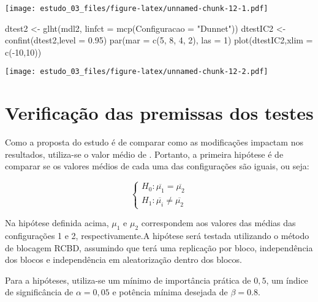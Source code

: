 \documentclass[
]{article}
\newenvironment{Shaded}{\begin{snugshade}}{\end{snugshade}}
\newcommand{\AttributeTok}[1]{\textcolor[rgb]{0.77,0.63,0.00}{#1}}
\newcommand{\DecValTok}[1]{\textcolor[rgb]{0.00,0.00,0.81}{#1}}
\newcommand{\FloatTok}[1]{\textcolor[rgb]{0.00,0.00,0.81}{#1}}
\newcommand{\FunctionTok}[1]{\textcolor[rgb]{0.00,0.00,0.00}{#1}}
\newcommand{\NormalTok}[1]{#1}
\newcommand{\OtherTok}[1]{\textcolor[rgb]{0.56,0.35,0.01}{#1}}
\newcommand{\SpecialCharTok}[1]{\textcolor[rgb]{0.00,0.00,0.00}{#1}}
\newcommand{\StringTok}[1]{\textcolor[rgb]{0.31,0.60,0.02}{#1}}
\begin{document}
\texttt{[image: estudo\_03\_files/figure-latex/unnamed-chunk-12-1.pdf]}

\begin{Shaded}
\begin{Highlighting}[]
\NormalTok{dtest2 }\OtherTok{\textless{}{-}} \FunctionTok{glht}\NormalTok{(mdl2, }\AttributeTok{linfct =} \FunctionTok{mcp}\NormalTok{(}\AttributeTok{Configuracao =} \StringTok{"Dunnet"}\NormalTok{))}
\NormalTok{dtestIC2 }\OtherTok{\textless{}{-}} \FunctionTok{confint}\NormalTok{(dtest2,}\AttributeTok{level =} \FloatTok{0.95}\NormalTok{)}
\FunctionTok{par}\NormalTok{(}\AttributeTok{mar =} \FunctionTok{c}\NormalTok{(}\DecValTok{5}\NormalTok{, }\DecValTok{8}\NormalTok{, }\DecValTok{4}\NormalTok{, }\DecValTok{2}\NormalTok{), }\AttributeTok{las =} \DecValTok{1}\NormalTok{)}
\FunctionTok{plot}\NormalTok{(dtestIC2,}\AttributeTok{xlim =} \FunctionTok{c}\NormalTok{(}\SpecialCharTok{{-}}\DecValTok{10}\NormalTok{,}\DecValTok{10}\NormalTok{))}
\end{Highlighting}
\end{Shaded}

\texttt{[image: estudo\_03\_files/figure-latex/unnamed-chunk-12-2.pdf]}

\hypertarget{verificauxe7uxe3o-das-premissas-dos-testes}{%
\section{Verificação das premissas dos
testes}\label{verificauxe7uxe3o-das-premissas-dos-testes}}

Como a proposta do estudo é de comparar como as modificações impactam
nos resultados, utiliza-se o valor médio de . Portanto, a primeira
hipótese é de comparar se os valores médios de cada uma das
configurações são iguais, ou seja:

\[
\begin{cases} H_0: \overline{\mu_1} = \overline{\mu_2}\\H_1: \overline{\mu_i} \neq \overline{\mu_2}\end{cases}
\]

Na hipótese definida acima, \(\mu_1\) e \(\mu_2\) correspondem aos
valores das médias das configurações 1 e 2, respectivamente.A hipótese
será testada utilizando o método de blocagem RCBD, assumindo que terá
uma replicação por bloco, independência dos blocos e independência em
aleatorização dentro dos blocos.

Para a hipóteses, utiliza-se um mínimo de importância prática de
\(0,5\), um índice de significância de \(\alpha = 0,05\) e potência
mínima desejada de \(\beta = 0.8\).
\end{document}
